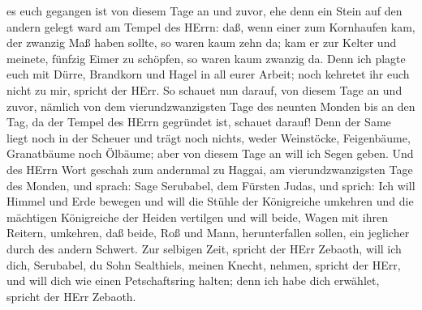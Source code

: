 es euch gegangen ist von diesem Tage an und zuvor, ehe denn ein Stein
auf den andern gelegt ward am Tempel des HErrn:  daß, wenn
einer zum Kornhaufen kam, der zwanzig Maß haben sollte, so waren kaum
zehn da; kam er zur Kelter und meinete, fünfzig Eimer zu schöpfen, so
waren kaum zwanzig da.  Denn ich plagte euch mit Dürre,
Brandkorn und Hagel in all eurer Arbeit; noch kehretet ihr euch nicht zu
mir, spricht der HErr.  So schauet nun darauf, von diesem
Tage an und zuvor, nämlich von dem vierundzwanzigsten Tage des neunten
Monden bis an den Tag, da der Tempel des HErrn gegründet ist, schauet
darauf!  Denn der Same liegt noch in der Scheuer und trägt
noch nichts, weder Weinstöcke, Feigenbäume, Granatbäume noch Ölbäume;
aber von diesem Tage an will ich Segen geben.  Und des
HErrn Wort geschah zum andernmal zu Haggai, am vierundzwanzigsten Tage
des Monden, und sprach:  Sage Serubabel, dem Fürsten Judas,
und sprich: Ich will Himmel und Erde bewegen  und will die
Stühle der Königreiche umkehren und die mächtigen Königreiche der Heiden
vertilgen und will beide, Wagen mit ihren Reitern, umkehren, daß beide,
Roß und Mann, herunterfallen sollen, ein jeglicher durch des andern
Schwert.  Zur selbigen Zeit, spricht der HErr Zebaoth, will
ich dich, Serubabel, du Sohn Sealthiels, meinen Knecht, nehmen, spricht
der HErr, und will dich wie einen Petschaftsring halten; denn ich habe
dich erwählet, spricht der HErr Zebaoth.
